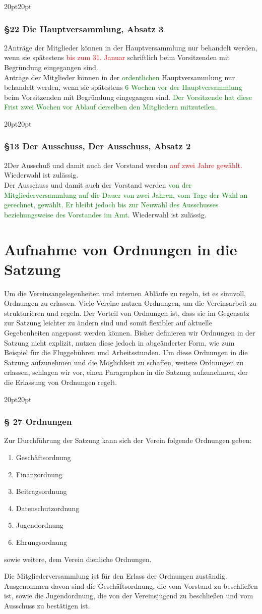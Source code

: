 \documentclass[10pt,a4paper,parskip=half]{scrartcl}
\newcommand{\new}[1]{\textcolor{Green}{#1}}
\newcommand{\old}[1]{\textcolor{Red}{#1}}
\newcommand{\change}[1]{
  \begin{adjustwidth}{20pt}{20pt}
    #1
  \end{adjustwidth}
}
\newcommand{\compare}[3]{\change{\subsubsection*{#1}\begin{multicols}{2}#2\columnbreak\\#3\end{multicols}}}
\begin{document}
\compare{§22 Die Hauptversammlung, Absatz 3}{Anträge der Mitglieder können in der Haupt\-ver\-samm\-lung nur behandelt werden,
  wenn sie spätestens \old{bis zum 31. Januar} schriftlich beim Vorsitzenden mit Begründung eingegangen sind.}
{Anträge der Mitglieder können in der \new{ordentlichen} Haupt\-ver\-samm\-lung nur behandelt werden,
  wenn sie spätestens \new{6 Wochen vor der Hauptversammlung} beim Vorsitzenden mit Begründung eingegangen sind.
  \new{Der Vorsitzende hat diese Frist zwei Wochen vor Ablauf derselben den Mitgliedern mitzuteilen.}
}

\compare{§13 Der Ausschuss, Der Ausschuss, Absatz 2}
{Der Ausschuß und damit auch der Vorstand werden \old{auf zwei Jahre gewählt.}
  Wiederwahl ist zulässig.}
{Der Ausschuss und damit auch der Vorstand werden \new{von der Mitgliederversammlung auf die Dauer von zwei Jahren, vom Tage der Wahl an gerechnet, gewählt.
    Er bleibt jedoch bis zur Neuwahl des Ausschusses beziehungsweise des Vorstandes im Amt}.  Wiederwahl ist zulässig.}

\clearpage
\section{Aufnahme von Ordnungen in die Satzung}
\label{sec:ordnungen}
Um die Vereinsangelegenheiten und internen Abläufe zu regeln, ist es sinnvoll, Ordnungen zu erlassen. Viele Vereine nutzen Ordnungen, um die Vereinsarbeit zu strukturieren und regeln. Der Vorteil von Ordnungen ist, dass sie im Gegensatz zur Satzung leichter zu ändern sind und somit flexibler auf aktuelle Gegebenheiten angepasst werden können. Bisher definieren wir Ordnungen in der Satzung nicht explizit, nutzen diese jedoch in abgeänderter Form, wie zum Beispiel für die Fluggebühren und Arbeitsstunden. Um diese Ordnungen in die Satzung aufzunehmen und die Möglichkeit zu schaffen, weitere Ordnungen zu erlassen, schlagen wir vor, einen Paragraphen in die Satzung aufzunehmen, der die Erlassung von Ordnungen regelt.

\change{
  \subsubsection*{§ 27 Ordnungen}
  Zur Durchführung der Satzung kann sich der Verein folgende Ordnungen geben:
  \begin{enumerate}[label=\alph*),noitemsep]
    \item Geschäftsordnung
    \item Finanzordnung
    \item Beitragsordnung
    \item Datenschutzordnung
    \item Jugendordnung
    \item Ehrungsordnung
  \end{enumerate}
  sowie weitere, dem Verein dienliche Ordnungen.
  \todo[inline]{Straf- oder Disziplinarordnung}

  Die Mitgliederversammlung ist für den Erlass der Ordnungen zuständig.
  Ausgenommen davon sind die Geschäftsordnung,
  die vom Vorstand zu beschließen ist,
  sowie die Jugendordnung,
  die von der Vereinsjugend zu beschließen und vom Ausschuss zu bestätigen ist.
}
\end{document}

